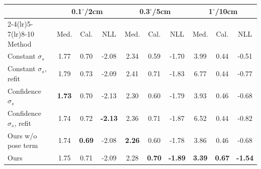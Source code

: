 \begin{tabular}{l ccccccccc}
\toprule
 & \multicolumn{3}{c}{0.1$^\circ$/2cm} & \multicolumn{3}{c}{0.3$^\circ$/5cm} & \multicolumn{3}{c}{1$^\circ$/10cm} \\
\cmidrule(lr){2-4}\cmidrule(lr){5-7}\cmidrule(lr){8-10}
Method & Med. & Cal. & NLL & Med. & Cal. & NLL & Med. & Cal. & NLL \\
\midrule
Constant $\sigma_s$ & 1.77 & 0.70 & -2.08 & 2.34 & 0.59 & -1.70 & 3.99 & 0.44 & -0.51 \\
Constant $\sigma_s$, refit & 1.79 & 0.73 & -2.09 & 2.41 & 0.71 & -1.83 & 6.77 & 0.44 & -0.77 \\
Confidence $\sigma_s$ & \textbf{1.73} & 0.70 & -2.13 & 2.30 & 0.60 & -1.79 & 3.93 & 0.46 & -0.68 \\
Confidence $\sigma_s$, refit & 1.74 & 0.72 & \textbf{-2.13} & 2.36 & 0.71 & -1.87 & 6.52 & 0.44 & -0.82 \\
Ours w/o pose term & 1.74 & \textbf{0.69} & -2.08 & \textbf{2.26} & 0.60 & -1.78 & 3.86 & 0.46 & -0.68 \\
Ours & 1.75 & 0.71 & -2.09 & 2.28 & \textbf{0.70} & \textbf{-1.89} & \textbf{3.39} & \textbf{0.67} & \textbf{-1.54} \\
\bottomrule
\end{tabular}